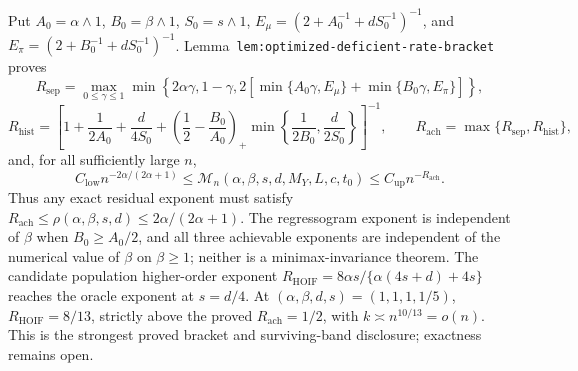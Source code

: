 Put \(A_0=\alpha\wedge1\), \(B_0=\beta\wedge1\), \(S_0=s\wedge1\), \(E_\mu=(2+A_0^{-1}+dS_0^{-1})^{-1}\), and \(E_\pi=(2+B_0^{-1}+dS_0^{-1})^{-1}\). Lemma~\texttt{lem:optimized-deficient-rate-bracket} proves
\[
R_{\mathrm{sep}}=\max_{0\le\gamma\le1}\min\left\{2\alpha\gamma,1-\gamma,2\left[\min\{A_0\gamma,E_\mu\}+\min\{B_0\gamma,E_\pi\}\right]\right\},
\]
\[
R_{\mathrm{hist}}=\left[1+\frac1{2A_0}+\frac d{4S_0}+\left(\frac12-\frac{B_0}{A_0}\right)_+\min\left\{\frac1{2B_0},\frac d{2S_0}\right\}\right]^{-1},
\qquad R_{\mathrm{ach}}=\max\{R_{\mathrm{sep}},R_{\mathrm{hist}}\},
\]
and, for all sufficiently large \(n\),
\[
C_{\mathrm{low}}n^{-2\alpha/(2\alpha+1)}\le\mathcal M_n(\alpha,\beta,s,d,M_Y,L,c,t_0)\le C_{\mathrm{up}}n^{-R_{\mathrm{ach}}}.
\]
Thus any exact residual exponent must satisfy \(R_{\mathrm{ach}}\le\rho(\alpha,\beta,s,d)\le2\alpha/(2\alpha+1)\). The regressogram exponent is independent of \(\beta\) when \(B_0\ge A_0/2\), and all three achievable exponents are independent of the numerical value of \(\beta\) on \(\beta\ge1\); neither is a minimax-invariance theorem. The candidate population higher-order exponent \(R_{\mathrm{HOIF}}=8\alpha s/\{\alpha(4s+d)+4s\}\) reaches the oracle exponent at \(s=d/4\). At \((\alpha,\beta,d,s)=(1,1,1,1/5)\), \(R_{\mathrm{HOIF}}=8/13\), strictly above the proved \(R_{\mathrm{ach}}=1/2\), with \(k\asymp n^{10/13}=o(n)\). This is the strongest proved bracket and surviving-band disclosure; exactness remains open.
